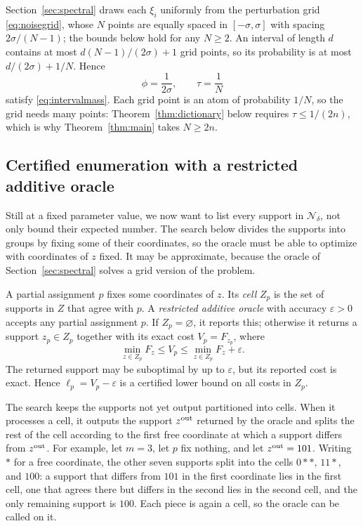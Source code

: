 Section~\ref{sec:spectral} draws each $\xi_i$ uniformly from the
perturbation grid \eqref{eq:noisegrid}, whose $N$ points are equally
spaced in $[-\sigma,\sigma]$ with spacing $2\sigma/(N-1)$; the bounds
below hold for any $N\ge2$. An interval of length $d$ contains at most
$d(N-1)/(2\sigma)+1$ grid points, so its probability is at most
$d/(2\sigma)+1/N$. Hence
\begin{equation}\label{eq:gridmass}
 \phi=\frac1{2\sigma},\qquad\tau=\frac1N
\end{equation}
satisfy \eqref{eq:intervalmass}. Each grid point is an atom of
probability $1/N$, so the grid needs many points:
Theorem~\ref{thm:dictionary} below requires $\tau\le1/(2n)$, which is
why Theorem~\ref{thm:main} takes $N\ge2n$.

\subsection{Certified enumeration with a restricted additive oracle}
Still at a fixed parameter value, we now want to list every support in
$\mathcal N_\delta$, not only bound their expected number. The search
below divides the supports into groups by fixing some of their
coordinates, so the oracle must be able to optimize with coordinates of
$z$ fixed. It may be approximate, because the oracle of
Section~\ref{sec:spectral} solves a grid version of the problem.

A partial assignment $p$ fixes some coordinates of $z$. Its \emph{cell}
$Z_p$ is the set of supports in $Z$ that agree with $p$. A
\emph{restricted additive oracle} with accuracy $\varepsilon>0$ accepts
any partial assignment $p$. If $Z_p=\varnothing$, it reports this;
otherwise it returns a support $z_p\in Z_p$ together with its exact cost
$V_p=F_{z_p}$, where
\begin{equation}\label{eq:oracle}
 \min_{z\in Z_p}F_z\le V_p\le\min_{z\in Z_p}F_z+\varepsilon.
\end{equation}
The returned support may be suboptimal by up to $\varepsilon$, but its
reported cost is exact. Hence $\ell_p=V_p-\varepsilon$ is a certified
lower bound on all costs in $Z_p$.

The search keeps the supports not yet output partitioned into cells.
When it processes a cell, it outputs the support $z^{\rm out}$ returned
by the oracle and splits the rest of the cell according to the first
free coordinate at which a support differs from $z^{\rm out}$. For
example, let $m=3$, let $p$ fix nothing, and let $z^{\rm out}=101$.
Writing $*$ for a free coordinate, the other seven supports split into
the cells $0{*}{*}$, $11{*}$, and $100$: a support that differs from
$101$ in the first coordinate lies in the first cell, one that agrees
there but differs in the second lies in the second cell, and the only
remaining support is $100$. Each piece is again a cell, so the oracle
can be called on it.


